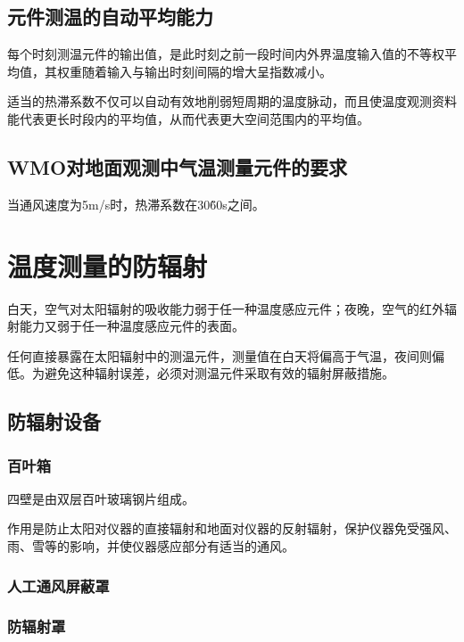 \documentclass[UTF8,11pt]{ctexbook}
\begin{document}
\subsection{元件测温的自动平均能力}

每个时刻测温元件的输出值，是此时刻之前一段时间内外界温度输入值的不等权平均值，其权重随着输入与输出时刻间隔的增大呈指数减小。

适当的热滞系数不仅可以自动有效地削弱短周期的温度脉动，而且使温度观测资料能代表更长时段内的平均值，从而代表更大空间范围内的平均值。

\subsection{WMO对地面观测中气温测量元件的要求}

当通风速度为5m/s时，热滞系数在30\~60s之间。

\section{温度测量的防辐射}

白天，空气对太阳辐射的吸收能力弱于任一种温度感应元件；夜晚，空气的红外辐射能力又弱于任一种温度感应元件的表面。

任何直接暴露在太阳辐射中的测温元件，测量值在白天将偏高于气温，夜间则偏低。为避免这种辐射误差，必须对测温元件采取有效的辐射屏蔽措施。

\subsection{防辐射设备}

\subsubsection{百叶箱}

四壁是由双层百叶玻璃钢片组成。

作用是防止太阳对仪器的直接辐射和地面对仪器的反射辐射，保护仪器免受强风、雨、雪等的影响，并使仪器感应部分有适当的通风。

\subsubsection{人工通风屏蔽罩}

\subsubsection{防辐射罩}
\end{document}
